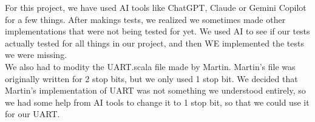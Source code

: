 For this project, we have used AI tools like ChatGPT, Claude or Gemini Copilot for a few things. After makings tests, we realized we sometimes made other implementations that were not being tested for yet. We used AI to see if our tests actually tested for all things in our project, and then WE implemented the tests we were missing.\\
We also had to modity the UART.scala file made by Martin. Martin's file was originally written for 2 stop bits, but we only used 1 stop bit. We decided that Martin's implementation of UART was not something we understood entirely, so we had some help from AI tools to change it to 1 stop bit, so that we could use it for our UART.
